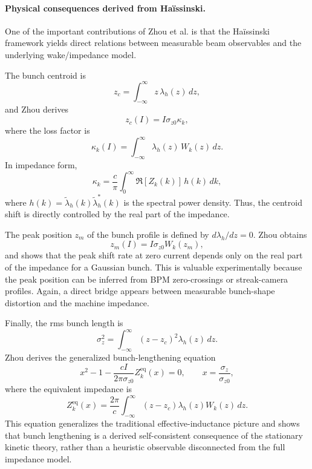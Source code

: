 \documentclass[11pt,a4paper]{article}
\begin{document}
\begin{sloppypar}
\paragraph{Physical consequences derived from Ha\"issinski.}
One of the important contributions of Zhou et al. is that the Ha\"issinski framework yields direct relations between measurable beam observables and the underlying wake/impedance model.

The bunch centroid is
\begin{equation}
z_c=\int_{-\infty}^{\infty} z\,\lambda_h(z)\,dz,
\end{equation}
and Zhou derives
\begin{equation}
z_c(I)=I\sigma_{z0}\kappa_k,
\label{eq:centroid_shift}
\end{equation}
where the loss factor is
\begin{equation}
\kappa_k(I)
=
\int_{-\infty}^{\infty}\lambda_h(z)\,W_k(z)\,dz.
\label{eq:loss_factor}
\end{equation}
In impedance form,
\begin{equation}
\kappa_k
=
\frac{c}{\pi}
\int_0^\infty
\Re[Z_k(k)]\,h(k)\,dk,
\label{eq:kappa_imp}
\end{equation}
where $h(k)=\tilde\lambda_h(k)\tilde\lambda_h^*(k)$ is the spectral power density. Thus, the centroid shift is directly controlled by the real part of the impedance. 

The peak position $z_m$ of the bunch profile is defined by $d\lambda_h/dz=0$. Zhou obtains
\begin{equation}
z_m(I)=I\sigma_{z0}W_k(z_m),
\label{eq:peak_shift}
\end{equation}
and shows that the peak shift rate at zero current depends only on the real part of the impedance for a Gaussian bunch. This is valuable experimentally because the peak position can be inferred from BPM zero-crossings or streak-camera profiles. Again, a direct bridge appears between measurable bunch-shape distortion and the machine impedance. 

Finally, the rms bunch length is
\begin{equation}
\sigma_z^2
=
\int_{-\infty}^{\infty}
(z-z_c)^2\lambda_h(z)\,dz.
\label{eq:bunch_length}
\end{equation}
Zhou derives the generalized bunch-lengthening equation
\begin{equation}
x^2-1-\frac{cI}{2\pi\sigma_{z0}}Z_k^{\mathrm{eq}}(x)=0,
\qquad
x=\frac{\sigma_z}{\sigma_{z0}},
\label{eq:quadratic_blen}
\end{equation}
where the equivalent impedance is
\begin{equation}
Z_k^{\mathrm{eq}}(x)
=
\frac{2\pi}{c}
\int_{-\infty}^{\infty}
(z-z_c)\lambda_h(z)W_k(z)\,dz.
\label{eq:zeq}
\end{equation}
This equation generalizes the traditional effective-inductance picture and shows that bunch lengthening is a derived self-consistent consequence of the stationary kinetic theory, rather than  a heuristic observable disconnected from the full impedance model. 


\end{sloppypar}
\end{document}
